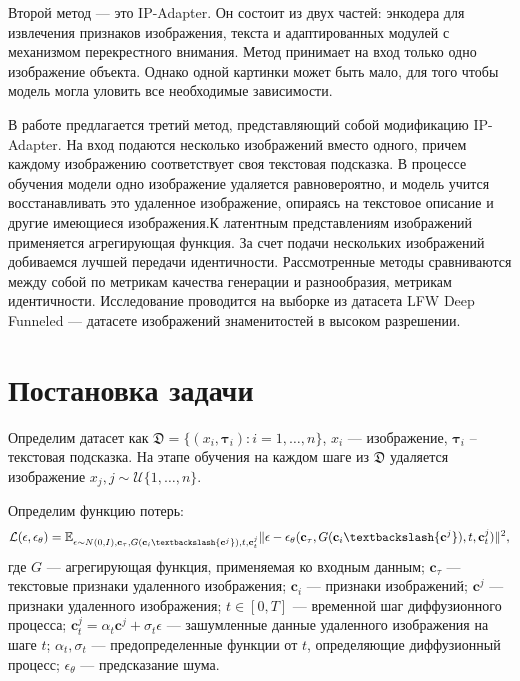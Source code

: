 \documentclass{article}
\begin{document}
Второй метод --- это IP-Adapter\cite{1}. Он состоит из двух частей: энкодера для извлечения признаков изображения, текста и адаптированных модулей с механизмом перекрестного внимания. Метод принимает на вход только одно изображение объекта. Однако одной картинки может быть мало, для того чтобы модель могла уловить все необходимые зависимости. 

В работе предлагается третий метод, представляющий собой модификацию IP-Adapter. На вход подаются несколько изображений вместо одного, причем каждому изображению соответствует своя текстовая подсказка. В процессе обучения модели одно изображение удаляется равновероятно, и модель учится восстанавливать это удаленное изображение, опираясь на текстовое описание и другие имеющиеся изображения.К латентным представлениям изображений применяется агрегирующая функция. За счет подачи нескольких изображений добиваемся лучшей передачи идентичности. 
Рассмотренные методы сравниваются между собой по метрикам качества генерации и разнообразия, метрикам идентичности.
Исследование проводится на выборке из датасета LFW Deep Funneled\cite{5} --- датасете изображений знаменитостей в высоком разрешении. 

\section{Постановка задачи}

Определим датасет как $ \mathfrak{D}=\{ ({x}_{i}, \mathbf{\tau}_{i}): i = 1, \dots, n\}$, ${x}_{i}$ --- изображение, $\mathbf{\tau}_{i}$ -- текстовая подсказка. На этапе обучения на каждом шаге из $\mathfrak{D}$ удаляется изображение ${x}_{j}, j \sim \mathcal{U}\{1, \dots, n\}$.

Определим функцию потерь: 
\begin{equation}
\mathcal{L}(\epsilon, \epsilon_{\theta}) = \mathbb{E}_{\epsilon \sim N(0, I),\mathbf{c}_{\tau}, G(\mathbf{c}_{i} \textbackslash \{\mathbf{c}^{j}\}), t, \mathbf{c}^{j}_{t}} \|\epsilon - \epsilon_{\theta}(\mathbf{c}_{\tau}, G(\mathbf{c}_{i} \textbackslash \{\mathbf{c}^{j}\}), t, \mathbf{c}^{j}_{t})\|^2,
\end{equation}
где $G$ --- агрегирующая функция, применяемая ко входным данным; $\mathbf{c}_{\tau}$ --- текстовые признаки удаленного изображения; $\mathbf{c}_{i}$ --- признаки изображений; $\mathbf{c}^{j}$ --- признаки удаленного изображения; $t \in [0, T]$ --- временной шаг диффузионного процесса; $\mathbf{c}^{j}_{t} = \alpha_t \mathbf{c}^{j}  + \sigma_t \epsilon$ --- зашумленные данные удаленного изображения на шаге $t$; $\alpha_t, \sigma_t$ --- предопределенные функции от $t$, определяющие диффузионный процесс; $\epsilon_{\theta}$ --- предсказание шума.
\end{document}
